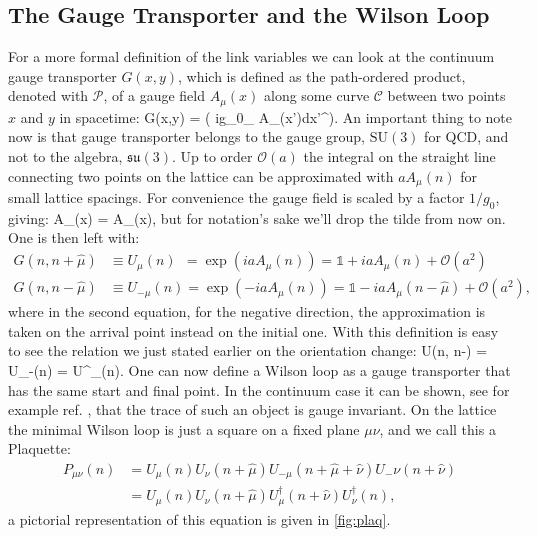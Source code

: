 \subsection{The Gauge Transporter and the Wilson Loop}
For a more formal definition of the link variables we can look at the continuum gauge transporter $G(x,y)$, which is defined as the path-ordered product, denoted with $\mathcal{P}$, of a gauge field $A_\mu(x)$ along some curve $\mathcal{C}$ between two points $x$ and $y$ in spacetime:
\beq
    G(x,y) =  \exp\left( ig_0\int_ A_\mu(x')dx'^\mu  \right).
\eeq
An important thing to note now is that gauge transporter belongs to the gauge group, $\mathrm{SU}(3)$ for QCD, and not to the algebra, $\mathfrak{su}(3)$. 
Up to order $\mathcal{O}(a)$ the integral on the straight line connecting two points on the lattice can be approximated with $aA_\mu(n)$ for small lattice spacings. For convenience the gauge field is scaled by a factor $1/g_0$, giving: 
\beq
\tilde A_\mu(x) =  A_\mu(x),
\label{eq:fieldscale}
\eeq
but for notation's sake we'll drop the tilde from now on. One is then left with:
\begin{align}
    G(n,n+\hat\mu) &\equiv U_\mu(n) ~~= \exp(iaA_\mu(n)) = \mathds{1} + iaA_\mu(n) + \mathcal{O}(a^2) \label{eq:transporter}\\\nonumber
    G(n,n-\hat\mu) &\equiv U_{-\mu}(n) = \exp(-iaA_\mu(n)) = \mathds{1} - iaA_\mu(n-\hat\mu) + \mathcal{O}(a^2),
\end{align}
where in the second equation, for the negative direction, the approximation is taken on the arrival point instead on the initial one. With this definition is easy to see the relation we just stated earlier on the orientation change:
\beq
    U(n, n-\hat\mu) = U_{-\mu}(n) = U^\dagger_\mu(n).
\eeq
One can now define a Wilson loop as a gauge transporter that has the same start and final point. In the continuum case it can be shown, see for example ref. \cite{peskin}, that the trace of such an object is gauge invariant. On the lattice the minimal Wilson loop is just a square on a fixed plane $\mu\nu$, and we call this a Plaquette:
\begin{align}
    \label{plaquette}
P_{\mu\nu}(n) &= U_\mu(n) U_\nu(n+\hat\mu) U_{-\mu}(n+\hat\mu+\hat\nu) U_-{\nu}(n+\hat\nu)  \\\nonumber
              &= U_\mu(n) U_\nu(n+\hat\mu) U^\dagger_\mu(n+\hat\nu) U^\dagger_\nu(n),
\end{align}
a pictorial representation of this equation is given in \cref{fig:plaq}.
